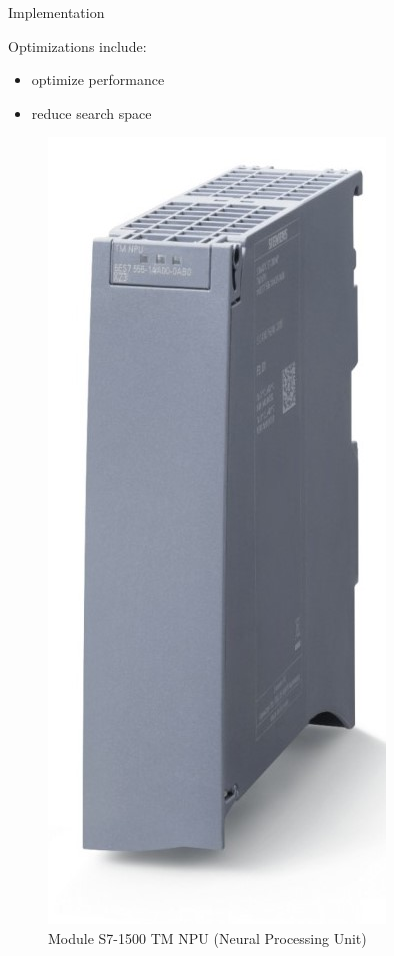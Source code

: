 \documentclass[en]{sdqbeamer}
\begin{document}
	\begin{frame}{Implementation}
		\begin{minipage}[b]{0.45\paperwidth}
			Optimizations include:
			\begin{itemize}
				\item optimize performance \cite{szegedy2015going} 
				\item reduce search space \cite{zhang2018ffs}
			\end{itemize}
		\end{minipage}
		\begin{minipage}{0.45\paperwidth}
			\begin{figure}
				\includegraphics[width= 0.47\paperwidth, right]{pictures/siemens_npu.png}
				\caption{Module S7-1500 TM NPU (Neural Processing Unit) \cite{siemensnpu_pic}}
			\end{figure}
		\end{minipage}
	\end{frame}
	
\end{document}
